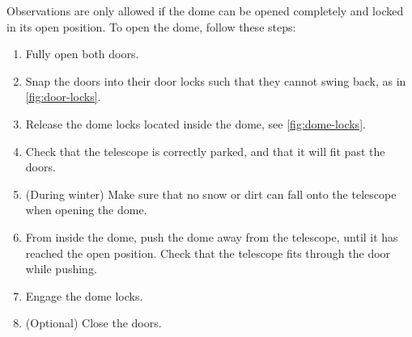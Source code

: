 \documentclass[a4paper, 11pt, fleqn]{memoir}
\begin{document}
Observations are only allowed if the dome can be opened completely and locked in its open position.
To open the dome, follow these steps:
\begin{enumerate}
    \item Fully open both doors.
    \item Snap the doors into their door locks such that they cannot swing back, as in \cref{fig:door-locks}.
    \item Release the dome locks located inside the dome, see \cref{fig:dome-locks}.
    \item Check that the telescope is correctly parked, and that it will fit past the doors.
    \item (During winter) Make sure that no snow or dirt can fall onto the telescope when opening the dome.
    \item From inside the dome, push the dome away from the telescope, until it has reached the open position.
          Check that the telescope fits through the door while pushing.
    \item Engage the dome locks.
    \item (Optional) Close the doors.
\end{enumerate}
\end{document}
